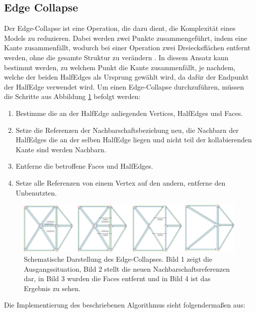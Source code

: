 \subsection{Edge Collapse}
Der Edge-Collapse ist eine Operation, die dazu dient, die Komplexit\"at eines Models zu reduzieren. Dabei werden zwei Punkte zusammengef\"uhrt, indem eine Kante zusammenf\"allt, wodurch bei einer Operation zwei Dreiecksfl\"achen entfernt werden, ohne die gesamte Struktur zu ver\"andern \cite{Castello07}. In diesem Ansatz kann bestimmt werden, zu welchem Punkt die Kante zusammenf\"allt, je nachdem, welche der beiden HalfEdges als Ursprung gew\"ahlt wird, da daf\"ur der Endpunkt der HalfEdge verwendet wird. 
Um einen Edge-Collapse durchzuf\"uhren, m\"ussen die Schritte aus Abbildung \ref{fig:edgecollapse} befolgt werden:
\begin{enumerate}
	\item Bestimme die an der HalfEdge anliegenden Vertices, HalfEdges und Faces.
	\item Setze die Referenzen der Nachbarschaftsbeziehung neu, die Nachbarn der HalfEdges die an der selben HalfEdge liegen und nicht teil der kollabierenden Kante sind werden Nachbarn.
	\item Entferne die betroffene Faces und HalfEdges.
	\item Setze alle Referenzen von einem Vertex auf den andern, entferne den Unbenutzten.
\end{enumerate}
\begin{figure}[H]
	\centering
	\includegraphics[width=1\linewidth]{Images/EdgeCollapse}
	\caption{Schematische Darstellung des Edge-Collapses. Bild 1 zeigt die Ausgangssituation, Bild 2 stellt die neuen Nachbarschaftsreferenzen dar, in Bild 3 wurden die Faces entfernt und in Bild 4 ist das Ergebnis zu sehen.}
	\label{fig:edgecollapse}
\end{figure}
Die Implementierung des beschriebenen Algorithmus sieht folgenderma{\ss}en aus:
